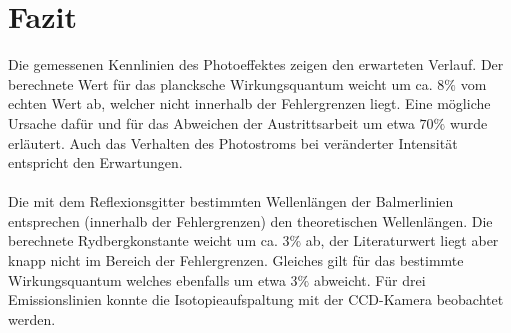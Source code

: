\section{Fazit}
Die gemessenen Kennlinien des Photoeffektes zeigen den erwarteten Verlauf. Der berechnete Wert für das plancksche Wirkungsquantum weicht um ca. $8\%$ vom echten Wert ab, welcher nicht innerhalb der Fehlergrenzen liegt. Eine mögliche Ursache dafür und für das Abweichen der Austrittsarbeit um etwa $70\%$ wurde erläutert. Auch das Verhalten des Photostroms bei veränderter Intensität entspricht den Erwartungen. \\ \\
Die mit dem Reflexionsgitter bestimmten Wellenlängen der Balmerlinien entsprechen (innerhalb der Fehlergrenzen) den theoretischen Wellenlängen. Die berechnete Rydbergkonstante weicht um ca. $3\%$ ab, der Literaturwert liegt aber knapp nicht im Bereich der Fehlergrenzen. Gleiches gilt für das bestimmte Wirkungsquantum welches ebenfalls um etwa $3\%$ abweicht. Für drei Emissionslinien konnte die Isotopieaufspaltung mit der CCD-Kamera beobachtet werden. 
